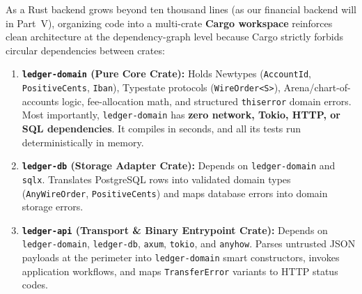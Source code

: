 As a Rust backend grows beyond ten thousand lines (as our financial backend will in Part~V), organizing code into a multi-crate \textbf{Cargo workspace} reinforces clean architecture at the dependency-graph level because Cargo strictly forbids circular dependencies between crates:

\begin{enumerate}
  \item \textbf{\texttt{ledger-domain} (Pure Core Crate):} Holds Newtypes (\texttt{AccountId}, \texttt{PositiveCents}, \texttt{Iban}), Typestate protocols (\texttt{WireOrder<S>}), Arena/chart-of-accounts logic, fee-allocation math, and structured \texttt{thiserror} domain errors. Most importantly, \texttt{ledger-domain} has \textbf{zero network, Tokio, HTTP, or SQL dependencies}. It compiles in seconds, and all its tests run deterministically in memory.
  \item \textbf{\texttt{ledger-db} (Storage Adapter Crate):} Depends on \texttt{ledger-domain} and \texttt{sqlx}. Translates PostgreSQL rows into validated domain types (\texttt{AnyWireOrder}, \texttt{PositiveCents}) and maps database errors into domain storage errors.
  \item \textbf{\texttt{ledger-api} (Transport \& Binary Entrypoint Crate):} Depends on \texttt{ledger-domain}, \texttt{ledger-db}, \texttt{axum}, \texttt{tokio}, and \texttt{anyhow}. Parses untrusted JSON payloads at the perimeter into \texttt{ledger-domain} smart constructors, invokes application workflows, and maps \texttt{TransferError} variants to HTTP status codes.
\end{enumerate}

